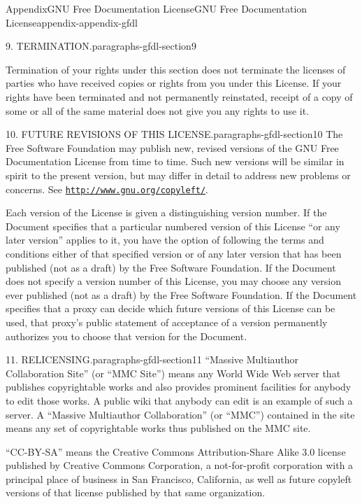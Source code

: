 \documentclass[twoside,10pt,]{book}
\numberwithin{equation}{part}
\begin{document}
\begin{appendixptx}{Appendix}{GNU Free Documentation License}{}{GNU Free Documentation License}{}{}{appendix-appendix-gfdl}
\begin{paragraphs}{9. TERMINATION.}{paragraphs-gfdl-section9}
\par
Termination of your rights under this section does not terminate the licenses of parties who have received copies or rights from you under this License. If your rights have been terminated and not permanently reinstated, receipt of a copy of some or all of the same material does not give you any rights to use it.%
\end{paragraphs}%
\begin{paragraphs}{10. FUTURE REVISIONS OF THIS LICENSE.}{paragraphs-gfdl-section10}%
The Free Software Foundation may publish new, revised versions of the GNU Free Documentation License from time to time. Such new versions will be similar in spirit to the present version, but may differ in detail to address new problems or concerns. See \href{http://www.gnu.org/copyleft/}{\nolinkurl{http://www.gnu.org/copyleft/}}.%
\par
Each version of the License is given a distinguishing version number. If the Document specifies that a particular numbered version of this License ``or any later version'' applies to it, you have the option of following the terms and conditions either of that specified version or of any later version that has been published (not as a draft) by the Free Software Foundation. If the Document does not specify a version number of this License, you may choose any version ever published (not as a draft) by the Free Software Foundation. If the Document specifies that a proxy can decide which future versions of this License can be used, that proxy's public statement of acceptance of a version permanently authorizes you to choose that version for the Document.%
\end{paragraphs}%
\begin{paragraphs}{11. RELICENSING.}{paragraphs-gfdl-section11}%
``Massive Multiauthor Collaboration Site'' (or ``MMC Site'') means any World Wide Web server that publishes copyrightable works and also provides prominent facilities for anybody to edit those works. A public wiki that anybody can edit is an example of such a server. A ``Massive Multiauthor Collaboration'' (or ``MMC'') contained in the site means any set of copyrightable works thus published on the MMC site.%
\par
``CC-BY-SA'' means the Creative Commons Attribution-Share Alike 3.0 license published by Creative Commons Corporation, a not-for-profit corporation with a principal place of business in San Francisco, California, as well as future copyleft versions of that license published by that same organization.%

\end{paragraphs}
\end{appendixptx}
\end{document}
